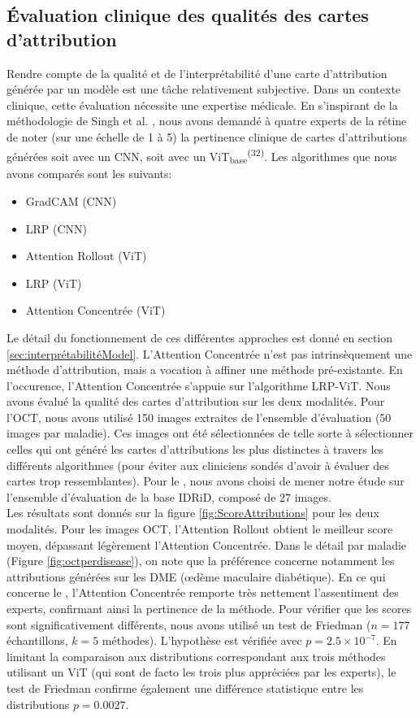 \subsection{Évaluation clinique des qualités des cartes d'attribution}
\label{sec:ClinicalSurveyResults}
Rendre compte de la qualité et de l'interprétabilité d'une carte d'attribution générée par un modèle est une tâche relativement subjective. Dans un contexte clinique, cette évaluation nécessite une expertise médicale. En s'inspirant de la méthodologie de Singh et al. \cite{singhWhatOptimalAttribution2020a}, nous avons demandé à quatre experts de la rétine de noter (sur une échelle de 1 à 5) la pertinence clinique de cartes d'attributions générées soit avec un CNN, soit avec un ViT\textsubscript{base}\textsuperscript{(32)}.
Les algorithmes que nous avons comparés sont les suivants:
\begin{itemize}
	\item GradCAM (CNN)
	\item LRP (CNN)
	\item Attention Rollout (ViT)
	\item LRP (ViT)
	\item Attention Concentrée (ViT)
\end{itemize}
Le détail du fonctionnement de ces différentes approches est donné en section \ref{sec:interprétabilitéModel}. L'Attention Concentrée n'est pas intrinsèquement une méthode d'attribution, mais a vocation à affiner une méthode pré-existante. En l'occurence, l'Attention Concentrée s'appuie sur l'algorithme LRP-ViT. Nous avons évalué la qualité des cartes d'attribution sur les deux modalités. Pour l'OCT, nous avons utilisé 150 images extraites de l'ensemble d'évaluation (50 images par maladie). Ces images ont été sélectionnées de telle sorte à sélectionner celles qui ont généré les cartes d'attributions les plus distinctes à travers les différents algorithmes (pour éviter aux cliniciens sondés d'avoir à évaluer des cartes trop ressemblantes). Pour le \fundus{}, nous avons choisi de mener notre étude sur l'ensemble d'évaluation de la base \ac{IDRiD}, composé de 27 images. \\
Les résultats sont donnés sur la figure \ref{fig:ScoreAttributions} pour les deux modalités. Pour les images OCT, l'Attention Rollout obtient le meilleur score moyen, dépassant légèrement l'Attention Concentrée. Dans le détail par maladie (Figure \ref{fig:octperdisease}), on note que la préférence concerne notamment les attributions générées sur les DME (\oe{}dème maculaire diabétique). En ce qui concerne le \fundus, l'Attention Concentrée remporte très nettement l'assentiment des experts, confirmant ainsi la pertinence de la méthode. Pour vérifier que les scores sont significativement différents, nous avons utilisé un test de Friedman ($n=177$ échantillons, $k=5$ méthodes). L'hypothèse est vérifiée avec $p=2.5 \times 10^{-7}$. En limitant la comparaison aux distributions correspondant aux trois méthodes utilisant un ViT (qui sont de facto les trois plus appréciées par les experts), le test de Friedman confirme également une différence statistique entre les distributions $p=0.0027$.

